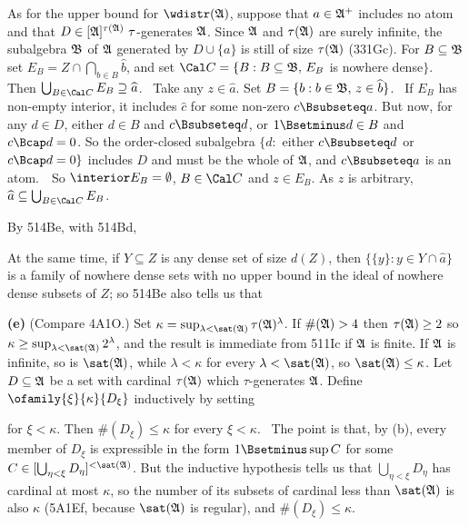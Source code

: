 { As for the upper bound for $\wdistr(\frak A)$, suppose
that $a\in\frak A^+$ includes no atom and that
$D\in[\frak A]^{\tau(\frak A)}\,\,\tau$-generates $\frak A$.   Since
$\frak A$ and $\tau(\frak A)$ are surely infinite, the subalgebra
$\frak B$ of $\frak A$ generated by $D\cup\{a\}$ is still of size
$\tau(\frak A)$ (331Gc).   For $B\subseteq\frak B$ set
$E_B=Z\cap\bigcap_{b\in B}\widehat{b}$, and set
$\Cal C=\{B:B\subseteq\frak B,\,E_B$ is nowhere dense$\}$.   Then
$\bigcup_{B\in\Cal C}E_B\supseteq\widehat{a}$.   \Prf\ Take any
$z\in\widehat{a}$.   Set $B=\{b:b\in\frak B,\,z\in\widehat{b}\}$.
\Quer\ If $E_B$ has non-empty interior, it includes $\widehat{c}$ for
some non-zero $c\Bsubseteq a$.   But now, for any $d\in D$, either
$d\in B$ and $c\Bsubseteq d$, or $1\Bsetminus d\in B$ and $c\Bcap d=0$.
So the order-closed subalgebra
$\{d:$ either $c\Bsubseteq d$ or $c\Bcap d=0\}$ includes $D$ and must be
the whole of $\frak A$, and $c\Bsubseteq a$ is an atom.\ \BanG\  So
$\interior E_B=\emptyset$, $B\in\Cal C$ and $z\in E_B$.   As $z$ is
arbitrary, $\widehat{a}\subseteq\bigcup_{B\in\Cal C}E_B$.\ \Qed

By 514Be, with 514Bd,


At the same time, if $Y\subseteq Z$ is any dense set of size $d(Z)$,
then $\{\{y\}:y\in Y\cap\widehat{a}\}$ is a family of nowhere dense sets
with no upper bound in the ideal of nowhere dense subsets of $Z$;  so
514Be also tells us that


\medskip

{\bf (e)} (Compare 4A1O.)   Set
$\kappa=\sup_{\lambda<\sat(\frak A)}\tau(\frak A)^{\lambda}$.   If
$\#(\frak A)>4$ then $\tau(\frak A)\ge 2$ so
$\kappa\ge\sup_{\lambda<\sat(\frak A)}2^{\lambda}$, and the
result is immediate from 511Ic if $\frak A$ is finite.   If $\frak A$ is
infinite, so is $\sat(\frak A)$, while $\lambda<\kappa$ for every
$\lambda<\sat(\frak A)$, so $\sat(\frak A)\le\kappa$.   Let
$D\subseteq\frak A$ be a set with cardinal $\tau(\frak A)$ which
$\tau$-generates $\frak A$.   Define
$\ofamily{\xi}{\kappa}{D_{\xi}}$ inductively by setting


\noindent for $\xi<\kappa$.   Then
$\#(D_{\xi})\le\kappa$ for every $\xi<\kappa$.   \Prf\ The
point is that, by (b), every member of $D_{\xi}$ is expressible in the
form $1\Bsetminus\sup C$ for some
$C\in[\bigcup_{\eta<\xi}D_{\eta}]^{<\sat(\frak A)}$.   But the inductive
hypothesis tells us that $\bigcup_{\eta<\xi}D_{\eta}$ has cardinal at
most $\kappa$, so the number of its subsets of
cardinal less than $\sat(\frak A)$ is also $\kappa$ (5A1Ef, because
$\sat(\frak A)$ is regular), and
$\#(D_{\xi})\le\kappa$.\ \Qed

}
